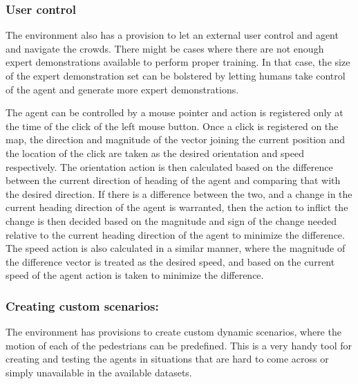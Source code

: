 \subsubsection*{User control}
The environment also has a provision to let an external user control and agent and navigate the crowds. There might be cases where there are not enough expert demonstrations available to perform proper training. In that case, the size of the expert demonstration set can be bolstered by letting humans take control of the agent and generate more expert demonstrations. 

The agent can be controlled by a mouse pointer and action is registered only at the time of the click of the left mouse button. Once a click is registered on the map, the direction and magnitude of the vector joining the current position and the location of the click are taken as the desired orientation and speed respectively.  
The orientation action is then calculated based on the difference between the current direction of heading of the agent and comparing that with the desired direction. If there is a difference between the two, and a change in the current heading direction of the agent is warranted, then the action to inflict the change is then decided based on the magnitude and sign of the change needed relative to the current heading direction of the agent to minimize the difference.
The speed action is also calculated in a similar manner, where the magnitude of the difference vector is treated as the desired speed, and based on the current speed of the agent action is taken to minimize the difference.

\subsubsection*{Creating custom scenarios:}
The environment has provisions to create custom dynamic scenarios, where the motion of each of the pedestrians can be predefined. This is a very handy tool for creating and testing the agents in situations that are hard to come across or simply unavailable in the available datasets.



